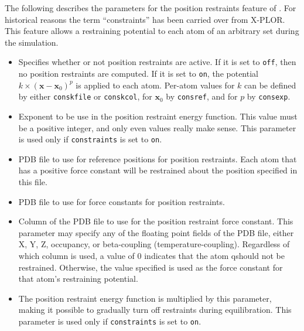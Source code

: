 The following describes the parameters for the position restraints feature of \NAMD.
For historical reasons the term ``constraints'' has been carried over from X-PLOR.
This feature allows a restraining potential to each atom of an arbitrary set during the simulation.

\begin{itemize}

\item
{}
{Specifies whether or not position restraints are active.
If it is set to {\tt off}, then no position restraints are computed.
If it is set to {\tt on}, the potential $k\times(\mathbf{x} - \mathbf{x}_0)^p$ is applied to each atom.
Per-atom values for $k$ can be defined by either {\tt conskfile} or {\tt conskcol}, for $\mathbf{x}_0$ by {\tt consref}, and for $p$ by {\tt consexp}.
}

\item
{}
{Exponent to be use in the position restraint energy function.
This value must be a positive integer, and only even values really make 
sense.  This parameter is used only if {\tt constraints} is set to 
{\tt on}.}

\item
{}
{PDB file to use for reference positions for position restraints.
Each atom that has a positive force constant will be restrained about the position specified in this file.}

\item
{}
{PDB file to use for force constants for 
position restraints.}

\item
{}
{Column of the PDB file to use for the position restraint force constant.
This parameter may specify any of the floating point fields of the PDB file, 
either X, Y, Z, occupancy, or beta-coupling (temperature-coupling).
Regardless of which column is used, a value of 0 indicates that the atom 
qshould not be restrained.
Otherwise, the value specified is used as the force constant for 
that atom's restraining potential.}

\item
{}
{The position restraint energy function is multiplied by this parameter,
making it possible to gradually turn off restraints during equilibration.
This parameter is used only if {\tt constraints} is set to 
{\tt on}.}


\end{itemize}
